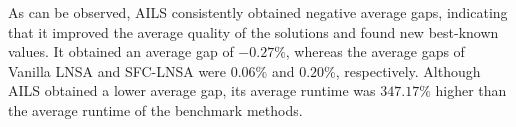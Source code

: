 As can be observed, AILS consistently obtained negative average gaps,
indicating that it improved the average quality of the solutions and found
new best-known values. It obtained an average gap of $-0.27\%$,
whereas the average gaps of Vanilla LNSA and SFC-LNSA were
$0.06\%$ and $0.20\%$, respectively. Although AILS
obtained a lower average gap, its average runtime was
$347.17\%$ higher than the average runtime of
the benchmark methods.
